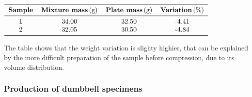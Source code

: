 \documentclass[a4paper, 11pt]{article}
\begin{document}
\begin{table}[htp]
	\centering
	$
	\begin{tabular}{cccc}
	\toprule
	\textbf{Sample} & \textbf{Mixture mass}\,\text{(g)} & \textbf{Plate mass}\,\text{(g)} & \textbf{Variation}\,\text{(\%)} \\
	\midrule
	1 & 34.00 & 32.50 & -4.41\\
	2 & 32.05 & 30.50 & -4.84\\
	\bottomrule
	\end{tabular}
	$
	\caption{Mass of the samples before and after pressing.}
	\label{tab:weights_comparison}
\end{table}

The table shows that the weight variation is slighty highier, that can be explained by the more difficult preparation of the sample before compression, due to its volume distribution.

\newpage

\subsubsection{Production of dumbbell specimens}
\end{document}
